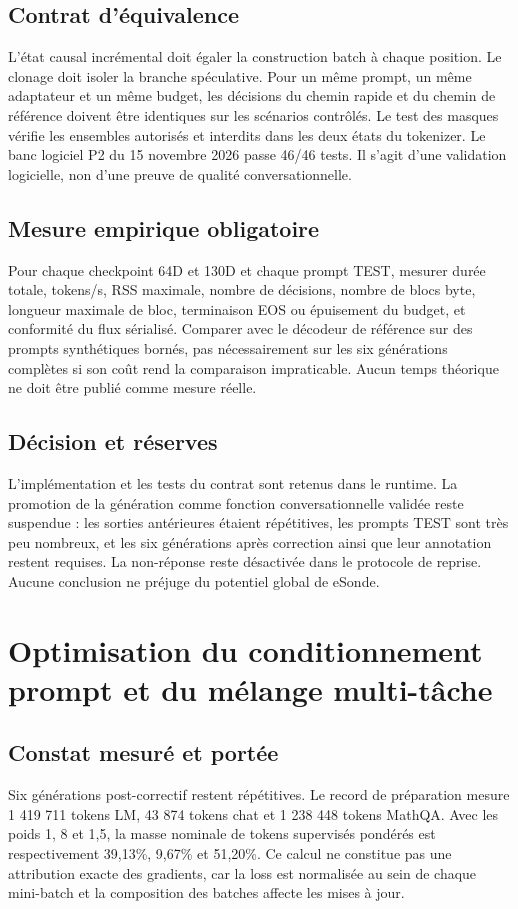 \documentclass[11pt,a4paper]{report}
\begin{document}
\section{Contrat d'équivalence}
L'état causal incrémental doit égaler la construction batch à chaque position. Le clonage doit isoler la branche spéculative. Pour un même prompt, un même adaptateur et un même budget, les décisions du chemin rapide et du chemin de référence doivent être identiques sur les scénarios contrôlés. Le test des masques vérifie les ensembles autorisés et interdits dans les deux états du tokenizer. Le banc logiciel P2 du 15 novembre 2026 passe 46/46 tests. Il s'agit d'une validation logicielle, non d'une preuve de qualité conversationnelle.
\section{Mesure empirique obligatoire}
Pour chaque checkpoint 64D et 130D et chaque prompt TEST, mesurer durée totale, tokens/s, RSS maximale, nombre de décisions, nombre de blocs byte, longueur maximale de bloc, terminaison EOS ou épuisement du budget, et conformité du flux sérialisé. Comparer avec le décodeur de référence sur des prompts synthétiques bornés, pas nécessairement sur les six générations complètes si son coût rend la comparaison impraticable. Aucun temps théorique ne doit être publié comme mesure réelle.
\section{Décision et réserves}
L'implémentation et les tests du contrat sont retenus dans le runtime. La promotion de la génération comme fonction conversationnelle validée reste suspendue : les sorties antérieures étaient répétitives, les prompts TEST sont très peu nombreux, et les six générations après correction ainsi que leur annotation restent requises. La non-réponse reste désactivée dans le protocole de reprise. Aucune conclusion ne préjuge du potentiel global de eSonde.

\chapter{Optimisation du conditionnement prompt et du mélange multi-tâche}
\label{tech:prompt-conditioning}
\section{Constat mesuré et portée}
Six générations post-correctif restent répétitives. Le record de préparation mesure 1 419 711 tokens LM, 43 874 tokens chat et 1 238 448 tokens MathQA. Avec les poids 1, 8 et 1,5, la masse nominale de tokens supervisés pondérés est respectivement 39,13\%, 9,67\% et 51,20\%. Ce calcul ne constitue pas une attribution exacte des gradients, car la loss est normalisée au sein de chaque mini-batch et la composition des batches affecte les mises à jour.
\end{document}
